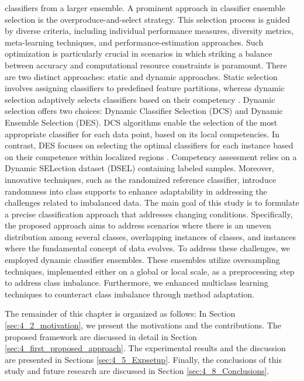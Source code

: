   classifiers from a larger ensemble. A prominent approach in classifier ensemble selection is the overproduce-and-select strategy. This
  selection process is guided by diverse criteria, including individual performance measures, diversity metrics, meta-learning techniques,
  and performance-estimation approaches. Such optimization is particularly crucial in scenarios in which striking a balance between
  accuracy and computational resource constraints is paramount. There are two distinct approaches: static and dynamic approaches.
  Static selection involves assigning classifiers to predefined feature partitions, whereas dynamic selection adaptively selects classifiers
  based on their competency \cite{lysiak2014optimal}. Dynamic selection offers two choices: Dynamic Classifier Selection (DCS) and Dynamic Ensemble
  Selection (DES). DCS algorithms enable the selection of the most appropriate classifier for each data point, based on its local competencies. In contrast, DES focuses on selecting the optimal classifiers for each instance based on their competence within localized
  regions \cite{cruz2017meta, widmer1996learning, lu2016concept}. Competency assessment relies on a Dynamic SELection dataset (DSEL) containing labeled samples. Moreover,
  innovative techniques, such as the randomized reference classifier, introduce randomness into class supports to enhance adaptability
  in addressing the challenges related to imbalanced data.
  The main goal of this study is to formulate a precise classification approach that addresses changing conditions. Specifically, the
  proposed approach aims to address scenarios where there is an uneven distribution among several classes, overlapping instances of
  classes, and instances where the fundamental concept of data evolves. To address these challenges, we employed dynamic classifier
  ensembles. These ensembles utilize oversampling techniques, implemented either on a global or local scale, as a preprocessing step to
  address class imbalance. Furthermore, we enhanced multiclass learning techniques to counteract class imbalance through method
  adaptation. 
  
  The remainder of this chapter is organized as follows: In Section \ref{sec:4_2_motivation}, we present the motivations and the contributions. The proposed framework are discussed in detail in Section \ref{sec:4_first_proposed_approach}. The  experimental results and the discussion are presented in Sections \ref{sec:4_5_Expsetup}. Finally, the conclusions of this study and future research are discussed in Section \ref{sec:4_8_Conclusions}. 
  
